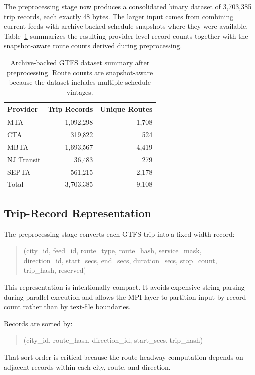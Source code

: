 \documentclass[sigconf,nonacm]{acmart}
\begin{document}
The preprocessing stage now produces a consolidated binary dataset of 3,703,385 trip records, each exactly 48 bytes. The larger input comes from combining current feeds with archive-backed schedule snapshots where they were available. Table~\ref{tab:dataset} summarizes the resulting provider-level record counts together with the snapshot-aware route counts derived during preprocessing.

\begin{table}[t]
  \centering
  \caption{Archive-backed GTFS dataset summary after preprocessing. Route counts are snapshot-aware because the dataset includes multiple schedule vintages.}
  \label{tab:dataset}
  \begin{tabular}{lrr}
    \toprule
    \textbf{Provider} & \textbf{Trip Records} & \textbf{Unique Routes} \\
    \midrule
    MTA & 1,092,298 & 1,708 \\
    CTA & 319,822 & 524 \\
    MBTA & 1,693,567 & 4,419 \\
    NJ Transit & 36,483 & 279 \\
    SEPTA & 561,215 & 2,178 \\
    \midrule
    Total & 3,703,385 & 9,108 \\
    \bottomrule
  \end{tabular}
\end{table}

\subsection{Trip-Record Representation}
The preprocessing stage converts each GTFS trip into a fixed-width record:
\begin{quote}
\small\ttfamily
(city\_id, feed\_id, route\_type, route\_hash, service\_mask,\\
direction\_id, start\_secs, end\_secs, duration\_secs, stop\_count,\\
trip\_hash, reserved)
\end{quote}
This representation is intentionally compact. It avoids expensive string parsing during parallel execution and allows the MPI layer to partition input by record count rather than by text-file boundaries.

Records are sorted by:
\begin{quote}
\small\ttfamily
(city\_id, route\_hash, direction\_id, start\_secs, trip\_hash)
\end{quote}
That sort order is critical because the route-headway computation depends on adjacent records within each city, route, and direction.
\end{document}
